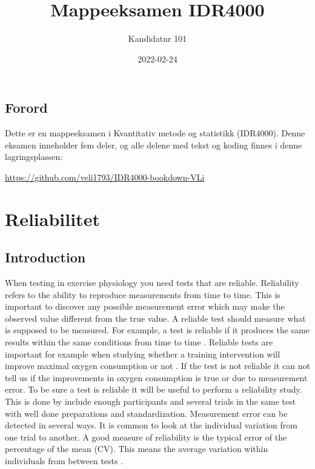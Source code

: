 \documentclass[
]{book}
\title{Mappeeksamen IDR4000}
\author{Kandidatnr 101}
\date{2022-02-24}
\begin{document}
\maketitle

{
\setcounter{tocdepth}{1}
\tableofcontents
}
\hypertarget{forord}{%
\section{Forord}\label{forord}}

Dette er en mappeeksamen i Kvantitativ metode og statistikk (IDR4000). Denne eksamen inneholder fem deler, og alle delene med tekst og koding finnes i denne lagringsplassen:

\url{https://github.com/veli1793/IDR4000-bookdown-VLi}

\hypertarget{reliabilitet}{%
\chapter{Reliabilitet}\label{reliabilitet}}

\hypertarget{introduction}{%
\section{Introduction}\label{introduction}}

When testing in exercise physiology you need tests that are reliable. Reliability refers to the ability to reproduce measurements from time to time. This is important to discover any possible measurement error which may make the observed value different from the true value. A reliable test should measure what is supposed to be measured. For example, a test is reliable if it produces the same results within the same conditions from time to time \citet{hopkins2000}. Reliable tests are important for example when studying whether a training intervention will improve maximal oxygen consumption or not \citep{peng2006}. If the test is not reliable it can not tell us if the improvements in oxygen consumption is true or due to measurement error. To be sure a test is reliable it will be useful to perform a reliability study. This is done by include enough participants and several trials in the same test with well done preparations and standardization. Measurement error can be detected in several ways. It is common to look at the individual variation from one trial to another. A good measure of reliability is the typical error of the percentage of the mean (CV). This means the average variation within individuals from between tests \citep{hopkins2000}.
\end{document}
